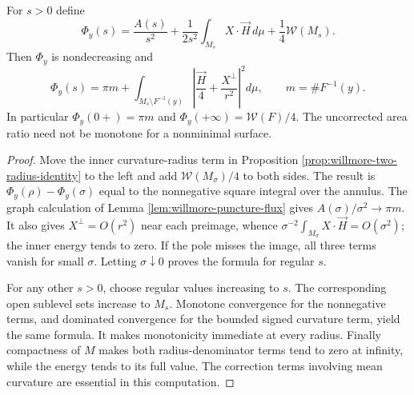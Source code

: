 \begin{proposition}\label{prop:willmore-corrected-area-monotonicity}
For $s>0$ define
\[
 \Phi_y(s)=\frac{A(s)}{s^2}+\frac1{2s^2}\int_{M_s}X\cdot\vec H\,d\mu
 +\frac14\mathcal W(M_s).
\]
Then $\Phi_y$ is nondecreasing and
\[
 \Phi_y(s)=\pi m+\int_{M_s\setminus F^{-1}(y)}
 \left|\frac{\vec H}4+\frac{X^\perp}{r^2}\right|^2d\mu,
 \qquad m=\#F^{-1}(y).
\]
In particular $\Phi_y(0+)=\pi m$ and $\Phi_y(+\infty)=\mathcal W(F)/4$. The uncorrected area ratio need not be monotone for a nonminimal surface.
\end{proposition}
\begin{proof}
Move the inner curvature-radius term in Proposition \ref{prop:willmore-two-radius-identity} to the left and add $\mathcal W(M_\sigma)/4$ to both sides. The result is $\Phi_y(\rho)-\Phi_y(\sigma)$ equal to the nonnegative square integral over the annulus. The graph calculation of Lemma \ref{lem:willmore-puncture-flux} gives $A(\sigma)/\sigma^2\to\pi m$. It also gives $X^\perp=O(r^2)$ near each preimage, whence $\sigma^{-2}\int_{M_\sigma}X\cdot\vec H=O(\sigma^2)$; the inner energy tends to zero. If the pole misses the image, all three terms vanish for small $\sigma$. Letting $\sigma\downarrow0$ proves the formula for regular $s$.

For any other $s>0$, choose regular values increasing to $s$. The corresponding open sublevel sets increase to $M_s$. Monotone convergence for the nonnegative terms, and dominated convergence for the bounded signed curvature term, yield the same formula. It makes monotonicity immediate at every radius. Finally compactness of $M$ makes both radius-denominator terms tend to zero at infinity, while the energy tends to its full value. The correction terms involving mean curvature are essential in this computation.
\end{proof}

